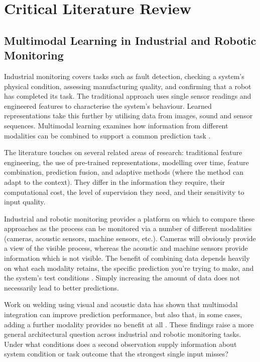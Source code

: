 \chapter{Critical Literature Review}

\label{ch:literature}

\section*{Multimodal Learning in Industrial and Robotic Monitoring}


Industrial monitoring covers tasks such as fault detection, checking a system's physical condition,
assessing manufacturing quality, and confirming that a robot has completed its task. The traditional
approach uses single sensor readings and engineered features to characterise the system's behaviour.
Learned representations take this further by utilising data from images, sound and sensor sequences.
Multimodal learning examines how information from different modalities can be combined to support a
common prediction task \parencite{Baltrusaitis2019Multimodal,Huo2022Multisensor,Thoduka2024Handover}.

The literature touches on several related areas of research: traditional feature engineering, the
use of pre-trained representations, modelling over time, feature combination, prediction fusion, and
adaptive methods (where the method can adapt to the context). They differ in the information they
require, their computational cost, the level of supervision they need, and their sensitivity to
input quality.

Industrial and robotic monitoring provides a platform on which to compare these approaches as the
process can be monitored via a number of different modalities (cameras, acoustic sensors, machine
sensors, etc.). Cameras will obviously provide a view of the visible process, whereas the acoustic
and machine sensors provide information which is not visible. The benefit of combining data depends
heavily on what each modality retains, the specific prediction you're trying to make, and the
system's test conditions \parencite{Wang2020What,Hua2026Weld,Goodarzi2023Deep}. Simply increasing the
amount of data does not necessarily lead to better predictions.

Work on welding using visual and acoustic data has shown that multimodal integration can improve prediction performance, but also that, in some cases, adding a further modality provides no benefit at all \parencite{P003,Hua2026Weld}. These findings raise a more general architectural question across industrial and robotic monitoring tasks. Under what conditions does a second observation supply information about system condition or task outcome that the strongest single input misses?

